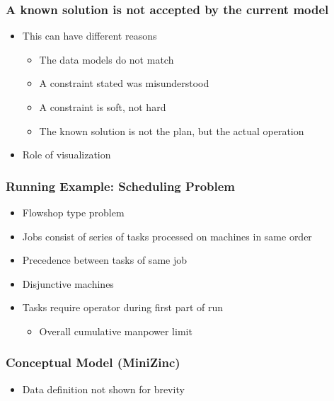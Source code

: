 \documentclass[dvipsnames,aspectratio=169]{beamer}
\begin{document}
\begin{frame}
\frametitle{A known solution is not accepted by the current model}
\begin{itemize}
\item This can have different reasons
\begin{itemize}
\item The data models do not match
\item A constraint stated was misunderstood
\item A constraint is soft, not hard
\item The known solution is not the plan, but the actual operation
\end{itemize}
\item Role of visualization
\end{itemize}
\end{frame}

\begin{frame}[label=running]
  \frametitle{Running Example: Scheduling Problem}
  \begin{itemize}
  \item Flowshop type problem
  \item Jobs consist of series of tasks processed on machines in same order
  \item Precedence between tasks of same job
  \item Disjunctive machines
  \item Tasks require operator during first part of run
  \begin{itemize}
      \item Overall cumulative manpower limit
  \end{itemize}
  \end{itemize}
\end{frame}

\begin{frame}[fragile,label=runningmodel]
\frametitle{Conceptual Model (MiniZinc)}

\begin{itemize}
    \item Data definition not shown for brevity
\end{itemize}
\end{frame}
\end{document}
